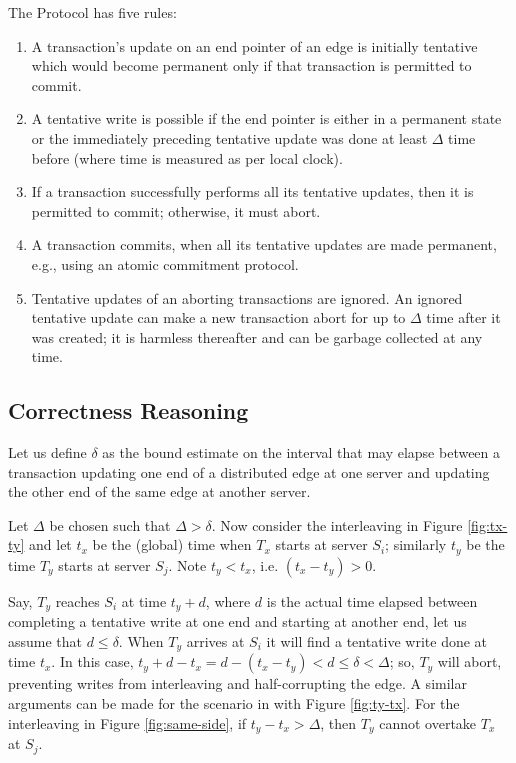 The \tDelta Protocol has five rules:
\begin{enumerate}
\item A transaction's update on an end pointer of an edge is initially tentative which would become permanent only if that transaction is permitted to commit.
\item A tentative write is possible if the end pointer is either in a permanent state or the immediately preceding tentative update was done at least $\Delta$ time before (where time is measured as per local clock).
\item If a transaction successfully performs all its tentative updates, then it is permitted to commit; otherwise, it must abort.
\item A transaction commits, when all its tentative updates are made permanent, e.g., using an atomic commitment protocol.
\item Tentative updates of an aborting transactions are ignored. An ignored tentative update can make a new transaction abort for up to $\Delta$ time after it was created; it is harmless thereafter and can be garbage collected at any time.
\end{enumerate}

\subsection{Correctness Reasoning}
\label{sec:corr-reas}

Let us define $\delta$ as the bound estimate on the interval that may elapse between a transaction updating one end of a distributed edge at one server and updating the other end of the same edge at another server.

Let $\Delta$ be chosen such that $\Delta > \delta$. Now consider the interleaving in Figure \ref{fig:tx-ty} and let $t_x$ be the (global) time when $T_x$ starts at server $S_i$; similarly $t_y$ be the time $T_y$ starts at server $S_j$. Note $t_y < t_x$, i.e. $(t_x - t_y) > 0$.

Say, $T_y$ reaches $S_i$ at time $t_y + d$, where $d$ is the actual time elapsed between completing a tentative write at one end and starting at another end, let us assume that $d \leq \delta$. When $T_y$ arrives at $S_i$ it will find a tentative write done at time $t_x$. In this case, $t_y + d - t_x = d - (t_x-t_y) < d \leq \delta < \Delta$; so, $T_y$ will abort, preventing writes from interleaving and half-corrupting the edge. A similar arguments can be made for the scenario in with Figure \ref{fig:ty-tx}. For the interleaving in Figure \ref{fig:same-side}, if $t_y - t_x > \Delta$, then $T_y$ cannot overtake $T_x$ at $S_j$.

